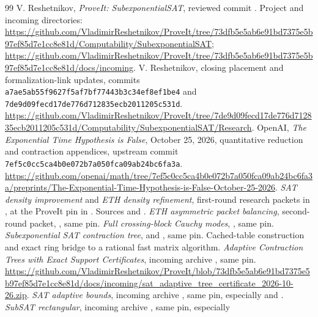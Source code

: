 \begin{thebibliography}{99}
 V. Reshetnikov, \emph{ProveIt: SubexponentialSAT}, reviewed
commit \pin. Project and incoming directories:
\url{https://github.com/VladimirReshetnikov/ProveIt/tree/73dfb5e5ab6e91bd7375e5b97ef85d7e1cc8e81d/Computability/SubexponentialSAT};
\url{https://github.com/VladimirReshetnikov/ProveIt/tree/73dfb5e5ab6e91bd7375e5b97ef85d7e1cc8e81d/docs/incoming}.
 V. Reshetnikov, closing placement and formalization-link
updates, commits \texttt{a7ae5ab55f9627f5af7bf77443b3c34ef8ef1be4}
and \texttt{7de9d09fecd17de776d712835ecb2011205c531d}.
\url{https://github.com/VladimirReshetnikov/ProveIt/tree/7de9d09fecd17de776d712835ecb2011205c531d/Computability/SubexponentialSAT/Research}.
 OpenAI, \emph{The Exponential Time Hypothesis is False},
October 25, 2026, quantitative reduction and contraction appendices,
upstream commit \texttt{7ef5c0cc5ca4b0e072b7a050fca09ab24bc6fa3a}.
\url{https://github.com/openai/math/tree/7ef5c0cc5ca4b0e072b7a050fca09ab24bc6fa3a/preprints/The-Exponential-Time-Hypothesis-is-False-October-25-2026}.
 \emph{SAT density improvement} and
\emph{ETH density refinement}, first-round research packets in
, at the ProveIt pin in
\cite{repo}. Sources 
and .
 \emph{ETH asymmetric packet balancing}, second-round
packet, , same pin.
 \emph{Full crossing-block Cauchy modes},
, same pin.
 \emph{Subexponential SAT contraction tree},
 and
, same pin. Cached-table construction and exact
ring bridge to a rational fast matrix algorithm.
 \emph{Adaptive Contraction Trees with Exact Support
Certificates}, incoming archive
, same pin.
\url{https://github.com/VladimirReshetnikov/ProveIt/blob/73dfb5e5ab6e91bd7375e5b97ef85d7e1cc8e81d/docs/incoming/sat_adaptive_tree_certificate_2026-10-26.zip}.
 \emph{SAT adaptive bounds}, incoming archive
, same pin, especially
 and .
 \emph{SubSAT rectangular}, incoming archive
, same pin, especially

\end{thebibliography}
